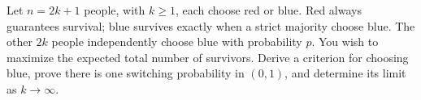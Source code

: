 Let $n=2k+1$ people, with $k\ge1$, each choose red or blue. Red always guarantees survival; blue survives exactly when a strict majority choose blue. The other $2k$ people independently choose blue with probability $p$. You wish to maximize the expected total number of survivors. Derive a criterion for choosing blue, prove there is one switching probability in $(0,1)$, and determine its limit as $k\to\infty$.
